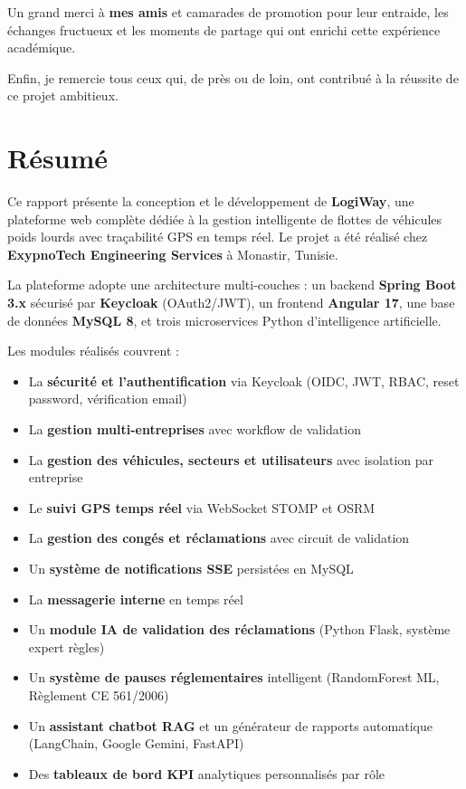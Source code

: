 \documentclass[12pt,a4paper]{report}
\begin{document}
Un grand merci à \textbf{mes amis} et camarades de promotion pour leur
entraide, les échanges fructueux et les moments de partage qui ont enrichi
cette expérience académique.

Enfin, je remercie tous ceux qui, de près ou de loin, ont contribué à
la réussite de ce projet ambitieux.


\chapter*{Résumé}

Ce rapport présente la conception et le développement de \textbf{LogiWay},
une plateforme web complète dédiée à la gestion intelligente de flottes
de véhicules poids lourds avec traçabilité GPS en temps réel.
Le projet a été réalisé chez \textbf{ExypnoTech Engineering Services}
à Monastir, Tunisie.

La plateforme adopte une architecture multi-couches : un backend
\textbf{Spring Boot 3.x} sécurisé par \textbf{Keycloak} (OAuth2/JWT),
un frontend \textbf{Angular 17}, une base de données \textbf{MySQL 8},
et trois microservices Python d'intelligence artificielle.

\medskip
Les modules réalisés couvrent :
\begin{itemize}
  \item La \textbf{sécurité et l'authentification} via Keycloak
        (OIDC, JWT, RBAC, reset password, vérification email)
  \item La \textbf{gestion multi-entreprises} avec workflow de validation
  \item La \textbf{gestion des véhicules, secteurs et utilisateurs}
        avec isolation par entreprise
  \item Le \textbf{suivi GPS temps réel} via WebSocket STOMP et OSRM
  \item La \textbf{gestion des congés et réclamations} avec circuit de validation
  \item Un \textbf{système de notifications SSE} persistées en MySQL
  \item La \textbf{messagerie interne} en temps réel
  \item Un \textbf{module IA de validation des réclamations} (Python Flask,
        système expert règles)
  \item Un \textbf{système de pauses réglementaires} intelligent
        (RandomForest ML, Règlement CE 561/2006)
  \item Un \textbf{assistant chatbot RAG} et un générateur de rapports
        automatique (LangChain, Google Gemini, FastAPI)
  \item Des \textbf{tableaux de bord KPI} analytiques personnalisés par rôle
\end{itemize}
\end{document}
